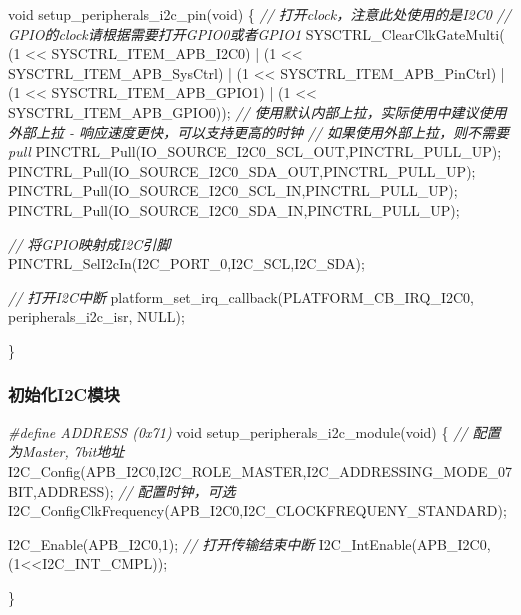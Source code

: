 \documentclass[
  12pt,
]{book}
\newenvironment{Shaded}{\begin{snugshade}}{\end{snugshade}}
\newcommand{\CommentTok}[1]{\textcolor[rgb]{0.56,0.35,0.01}{\textit{#1}}}
\newcommand{\DataTypeTok}[1]{\textcolor[rgb]{0.13,0.29,0.53}{#1}}
\newcommand{\DecValTok}[1]{\textcolor[rgb]{0.00,0.00,0.81}{#1}}
\newcommand{\NormalTok}[1]{#1}
\newcommand{\PreprocessorTok}[1]{\textcolor[rgb]{0.56,0.35,0.01}{\textit{#1}}}
\begin{document}
\begin{Shaded}
\begin{Highlighting}[]
\DataTypeTok{void}\NormalTok{ setup_peripherals_i2c_pin(}\DataTypeTok{void}\NormalTok{)}
\NormalTok{\{}
  \CommentTok{// 打开clock，注意此处使用的是I2C0}
  \CommentTok{// GPIO的clock请根据需要打开GPIO0或者GPIO1}
\NormalTok{  SYSCTRL_ClearClkGateMulti(    (}\DecValTok{1}\NormalTok{ << SYSCTRL_ITEM_APB_I2C0)}
\NormalTok{                                | (}\DecValTok{1}\NormalTok{ << SYSCTRL_ITEM_APB_SysCtrl)}
\NormalTok{                                | (}\DecValTok{1}\NormalTok{ << SYSCTRL_ITEM_APB_PinCtrl)}
\NormalTok{                                | (}\DecValTok{1}\NormalTok{ << SYSCTRL_ITEM_APB_GPIO1)}
\NormalTok{                                | (}\DecValTok{1}\NormalTok{ << SYSCTRL_ITEM_APB_GPIO0));}
  \CommentTok{// 使用默认内部上拉，实际使用中建议使用外部上拉 - 响应速度更快，可以支持更高的时钟}
  \CommentTok{// 如果使用外部上拉，则不需要pull}
\NormalTok{  PINCTRL_Pull(IO_SOURCE_I2C0_SCL_OUT,PINCTRL_PULL_UP);}
\NormalTok{  PINCTRL_Pull(IO_SOURCE_I2C0_SDA_OUT,PINCTRL_PULL_UP);}
\NormalTok{  PINCTRL_Pull(IO_SOURCE_I2C0_SCL_IN,PINCTRL_PULL_UP);}
\NormalTok{  PINCTRL_Pull(IO_SOURCE_I2C0_SDA_IN,PINCTRL_PULL_UP);}
  
  \CommentTok{// 将GPIO映射成I2C引脚}
\NormalTok{  PINCTRL_SelI2cIn(I2C_PORT_0,I2C_SCL,I2C_SDA);}
  
  \CommentTok{// 打开I2C中断}
\NormalTok{  platform_set_irq_callback(PLATFORM_CB_IRQ_I2C0, peripherals_i2c_isr, NULL);}
  
\NormalTok{\}}
\end{Highlighting}
\end{Shaded}

\hypertarget{ux521dux59cbux5316i2cux6a21ux5757-6}{%
\subsubsection{初始化I2C模块}\label{ux521dux59cbux5316i2cux6a21ux5757-6}}

\begin{Shaded}
\begin{Highlighting}[]
\PreprocessorTok{#define ADDRESS (0x71)}
\DataTypeTok{void}\NormalTok{ setup_peripherals_i2c_module(}\DataTypeTok{void}\NormalTok{)}
\NormalTok{\{}
  \CommentTok{// 配置为Master, 7bit地址}
\NormalTok{  I2C_Config(APB_I2C0,I2C_ROLE_MASTER,I2C_ADDRESSING_MODE_07BIT,ADDRESS);}
  \CommentTok{// 配置时钟，可选}
\NormalTok{  I2C_ConfigClkFrequency(APB_I2C0,I2C_CLOCKFREQUENY_STANDARD);}
  
\NormalTok{  I2C_Enable(APB_I2C0,}\DecValTok{1}\NormalTok{);}
  \CommentTok{// 打开传输结束中断}
\NormalTok{  I2C_IntEnable(APB_I2C0,(}\DecValTok{1}\NormalTok{<<I2C_INT_CMPL));}

\NormalTok{\}}
\end{Highlighting}
\end{Shaded}
\end{document}
